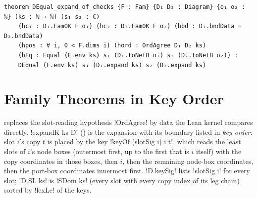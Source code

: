 {\begin{theorem}\label{thm:boxes-DEqual-expand-checks}
\begin{lstlisting}[style=leanbox]
theorem DEqual_expand_of_checks {F : Fam} {D₁ D₂ : Diagram} {o₁ o₂ : ℕ} (ks : ℕ → ℕ) (s₁ s₂ : ℂ)
    (hc₁ : D₁.FamOK F o₁) (hc₂ : D₂.FamOK F o₂) (hbd : D₁.bndData = D₂.bndData)
    (hpos : ∀ i, 0 < F.dims i) (hord : OrdAgree D₁ D₂ ks)
    (hEq : Equal (F.env ks) s₁ (D₁.toNetB o₁) s₂ (D₂.toNetB o₂)) :
    DEqual (F.env ks) s₁ (D₁.expand ks) s₂ (D₂.expand ks)
\end{lstlisting}
\end{theorem}

\section{Family Theorems in Key Order}\label{sec:boxes-famk}

 replaces the slot-reading hypothesis \lbx!OrdAgree! by data the Lean kernel compares directly. \lbx!expandK ks D! () is the expansion with its boundary listed in \emph{key order}: slot $i$'s copy $t$ is placed by the key \lbx!keyOf (slotSig i) i t!, which reads the least slots of $i$'s node boxes (outermost first, up to the first that is $i$ itself) with the copy coordinates in those boxes, then $i$, then the remaining node-box coordinates, then the port-box coordinates innermost first. \lbx!D.keySig! lists \lbx!slotSig i! for every slot; \lbx!D.SL ks! is \lbx!SDom ks! (every slot with every copy index of its leg chain) sorted by \lbx!lexLe! of the keys.

}
